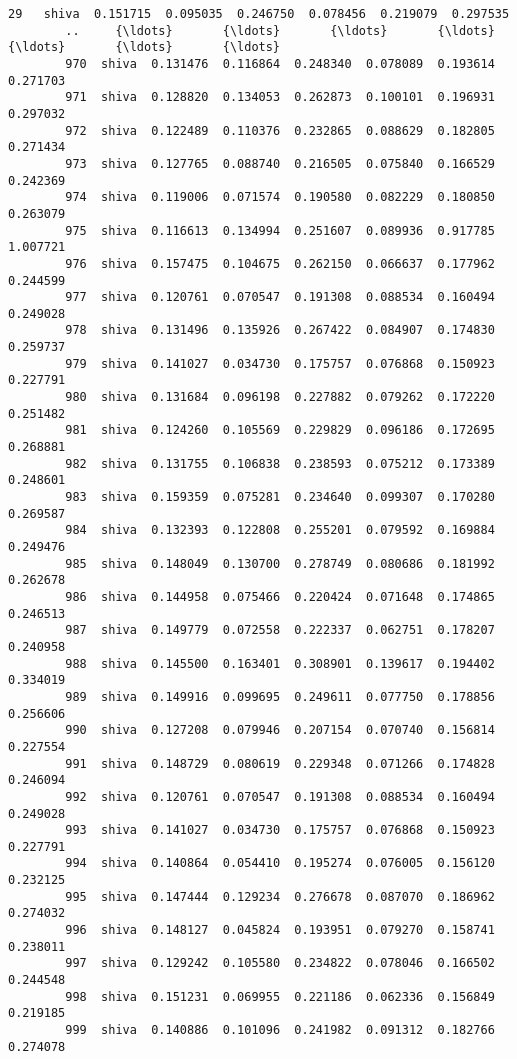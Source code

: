 \documentclass[11pt]{article}
\begin{document}
\begin{Verbatim}[commandchars=\\\{\}]
        29   shiva  0.151715  0.095035  0.246750  0.078456  0.219079  0.297535   
        ..     {\ldots}       {\ldots}       {\ldots}       {\ldots}       {\ldots}       {\ldots}       {\ldots}   
        970  shiva  0.131476  0.116864  0.248340  0.078089  0.193614  0.271703   
        971  shiva  0.128820  0.134053  0.262873  0.100101  0.196931  0.297032   
        972  shiva  0.122489  0.110376  0.232865  0.088629  0.182805  0.271434   
        973  shiva  0.127765  0.088740  0.216505  0.075840  0.166529  0.242369   
        974  shiva  0.119006  0.071574  0.190580  0.082229  0.180850  0.263079   
        975  shiva  0.116613  0.134994  0.251607  0.089936  0.917785  1.007721   
        976  shiva  0.157475  0.104675  0.262150  0.066637  0.177962  0.244599   
        977  shiva  0.120761  0.070547  0.191308  0.088534  0.160494  0.249028   
        978  shiva  0.131496  0.135926  0.267422  0.084907  0.174830  0.259737   
        979  shiva  0.141027  0.034730  0.175757  0.076868  0.150923  0.227791   
        980  shiva  0.131684  0.096198  0.227882  0.079262  0.172220  0.251482   
        981  shiva  0.124260  0.105569  0.229829  0.096186  0.172695  0.268881   
        982  shiva  0.131755  0.106838  0.238593  0.075212  0.173389  0.248601   
        983  shiva  0.159359  0.075281  0.234640  0.099307  0.170280  0.269587   
        984  shiva  0.132393  0.122808  0.255201  0.079592  0.169884  0.249476   
        985  shiva  0.148049  0.130700  0.278749  0.080686  0.181992  0.262678   
        986  shiva  0.144958  0.075466  0.220424  0.071648  0.174865  0.246513   
        987  shiva  0.149779  0.072558  0.222337  0.062751  0.178207  0.240958   
        988  shiva  0.145500  0.163401  0.308901  0.139617  0.194402  0.334019   
        989  shiva  0.149916  0.099695  0.249611  0.077750  0.178856  0.256606   
        990  shiva  0.127208  0.079946  0.207154  0.070740  0.156814  0.227554   
        991  shiva  0.148729  0.080619  0.229348  0.071266  0.174828  0.246094   
        992  shiva  0.120761  0.070547  0.191308  0.088534  0.160494  0.249028   
        993  shiva  0.141027  0.034730  0.175757  0.076868  0.150923  0.227791   
        994  shiva  0.140864  0.054410  0.195274  0.076005  0.156120  0.232125   
        995  shiva  0.147444  0.129234  0.276678  0.087070  0.186962  0.274032   
        996  shiva  0.148127  0.045824  0.193951  0.079270  0.158741  0.238011   
        997  shiva  0.129242  0.105580  0.234822  0.078046  0.166502  0.244548   
        998  shiva  0.151231  0.069955  0.221186  0.062336  0.156849  0.219185   
        999  shiva  0.140886  0.101096  0.241982  0.091312  0.182766  0.274078   
        

\end{Verbatim}
\end{document}
